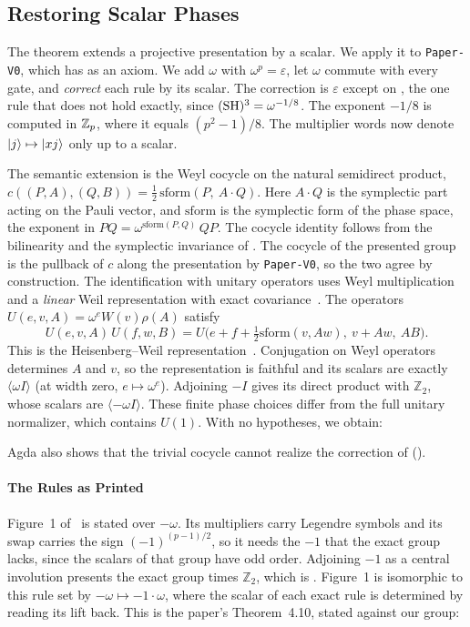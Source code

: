\documentclass[acmsmall,screen,nonacm]{acmart}
\begin{document}
\subsection{Restoring Scalar Phases}\label{app:q-scalars}

 The theorem  extends a projective presentation by a scalar. We apply it to \texttt{Paper-V0}, which has  as an axiom. We add $\omega$ with $\omega^{p} = \varepsilon$, let $\omega$ commute with every gate, and \emph{correct} each rule by its scalar. The correction is $\varepsilon$ except on , the one rule that does not hold exactly, since $(\mathrm{S}\mathrm{H})^3 = \omega^{-1/8}$. The exponent $-1/8$ is computed in $\mathbb{Z}_p$, where it equals $(p^2-1)/8$. The multiplier words now denote $|j\rangle \mapsto |xj\rangle$ only up to a scalar.

The semantic extension is the Weyl cocycle on the natural semidirect product, $c((P,A),(Q,B)) = \tfrac12\,\mathrm{sform}(P,\ A \cdot Q)$. Here $A \cdot Q$ is the symplectic part acting on the Pauli vector, and $\mathrm{sform}$ is the symplectic form of the phase space, the exponent in $PQ = \omega^{\mathrm{sform}(P,Q)}\,QP$. The cocycle identity follows from the bilinearity and the symplectic invariance of . The cocycle of the presented group is the pullback of $c$ along the presentation by \texttt{Paper-V0}, so the two agree by construction. The identification with unitary operators uses Weyl multiplication~\cite[Eq.~(4), Theorem~3]{gross2006hudson} and a \emph{linear} Weil representation with exact covariance~\cite[Theorem~1.3.2]{gurevich2007geometric}. The operators $U(e,v,A)=\omega^e W(v)\rho(A)$ satisfy
\[
 U(e,v,A)\,U(f,w,B)
 =U\bigl(e+f+\tfrac12\mathrm{sform}(v,Aw),\ v+Aw,\ AB\bigr).
\]
This is the Heisenberg--Weil representation~\cite[\S 1.3]{gurevich2010bounds}. Conjugation on Weyl operators determines $A$ and $v$, so the representation is faithful and its scalars are exactly $\langle\omega I\rangle$ (at width zero, $e\mapsto\omega^e$). Adjoining $-I$ gives its direct product with $\mathbb Z_2$, whose scalars are $\langle-\omega I\rangle$. These finite phase choices differ from the full unitary normalizer, which contains $U(1)$. With no hypotheses, we obtain:

{\renewcommand{\AgdaCodeStyle}{\scriptsize}}

\noindent Agda also shows that the trivial cocycle cannot realize the correction of  ().

\paragraph{The Rules as Printed} Figure~1 of~\quditcite{} is stated over $-\omega$. Its multipliers carry Legendre symbols and its swap carries the sign $(-1)^{(p-1)/2}$, so it needs the $-1$ that the exact group lacks, since the scalars of that group have odd order. Adjoining $-1$ as a central involution presents the exact group times $\mathbb Z_2$, which is . Figure~1 is isomorphic to this rule set by $-\omega \mapsto -1\cdot\omega$, where the scalar of each exact rule is determined by reading its lift back. This is the paper's Theorem~4.10, stated against our group:
\end{document}

